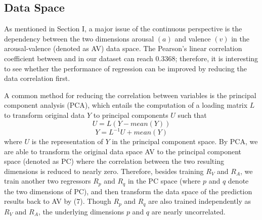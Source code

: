 \documentclass[journal, twoside]{IEEEtran}
\begin{document}
\subsection{Data Space}
As mentioned in Section I, a major issue of the continuous
perspective is the dependency between the two dimensions
arousal \((a)\) and valence \((v)\) in the arousal-valence (denoted as
AV) data space. The Pearson’s linear correlation coefficient
between and in our dataset can reach 0.3368; therefore, it is
interesting to see whether the performance of regression can be
improved by reducing the data correlation first.

A common method for reducing the correlation between variables is the principal component analysis (PCA)\cite{16}, which entails the computation of a loading matrix \(L\) to transform original data \(Y\) to principal components \(U\) such that
\begin{equation}
    U = L(Y - mean(Y))
\end{equation}
\begin{equation}
    Y=L^{-1}U + mean(Y)
\end{equation}
where \(U\) is the representation of \(Y\) in the principal component
space. By PCA, we are able to transform the original data space
AV to the principal component space (denoted as PC) where the
correlation between the two resulting dimensions is reduced to
nearly zero. Therefore, besides training \(R_V\) and \(R_A\), we train
another two regressors \(R_p\) and \(R_q\) in the PC space (where \(p\)
and \(q\) denote the two dimensions of PC), and then transform the
data space of the prediction results back to AV by (7). Though \(R_p\)
and \(R_q\) are also trained independently as \(R_V\) and \(R_A\), the
underlying dimensions \(p\) and \(q\) are nearly uncorrelated.
\end{document}
